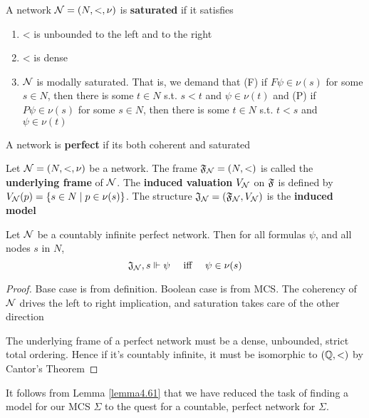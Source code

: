 \documentclass[11pt]{article}
\begin{document}
\begin{definition}[]
A network \(\mathcal{N}=(N,<,\nu)\) is \textbf{saturated} if it satisfies
\begin{enumerate}
\item < is unbounded to the left and to the right
\item < is dense
\item \(\mathcal{N}\) is modally saturated. That is, we demand that (F) if
\(F\psi\in\nu(s)\) for some \(s\in N\), then there is some \(t\in N\) s.t.
\(s<t\) and \(\psi\in\nu(t)\) and (P) if \(P\psi\in\nu(s)\) for some
\(s\in N\), then there is some \(t\in N\) s.t. \(t<s\) and
\(\psi\in\nu(t)\)
\end{enumerate}
\end{definition}

A network is \textbf{perfect} if its both coherent and saturated

\begin{definition}[]
Let \(\mathcal{N}=(N,<,\nu)\) be a network. The frame \(\mathfrak{F}_{\mathcal{N}}=(N,<)\) is called
the \textbf{underlying frame} of \(\mathcal{N}\). The \textbf{induced valuation} \(V_{\mathcal{N}}\) on
\(\mathfrak{F}\) is defined by \(V_{\mathcal{N}}(p)=\{s\in N\mid p\in\nu(s)\}\). The
structure \(\mathfrak{J}_{\mathcal{N}}=(\mathfrak{F}_{\mathcal{N}},V_{\mathcal{N}})\) is the \textbf{induced model}
\end{definition}

\begin{lemma}
\label{lemma4.61}
Let \(\mathcal{N}\) be a countably infinite perfect network. Then for all formulas
\(\psi\), and all nodes \(s\) in \(N\),
\begin{equation*}
\mathfrak{J}_{\mathcal{N}},s\Vdash\psi \quad\text{ iff }\quad
\psi\in\nu(s)
\end{equation*}
\end{lemma}

\begin{proof}
Base case is from definition. Boolean case is from MCS.
The coherency of \(\mathcal{N}\) drives the left to right implication, and
saturation takes care of the other direction

The underlying frame of a perfect network must be a dense, unbounded, strict
total ordering. Hence if it's countably infinite, it must be isomorphic to
\((\mathbb{Q},<)\) by Cantor's Theorem
\end{proof}

It follows from Lemma \ref{lemma4.61} that we have reduced the task of finding a
model for our MCS \(\Sigma\) to the quest for a countable, perfect network for \(\Sigma\).
\end{document}
